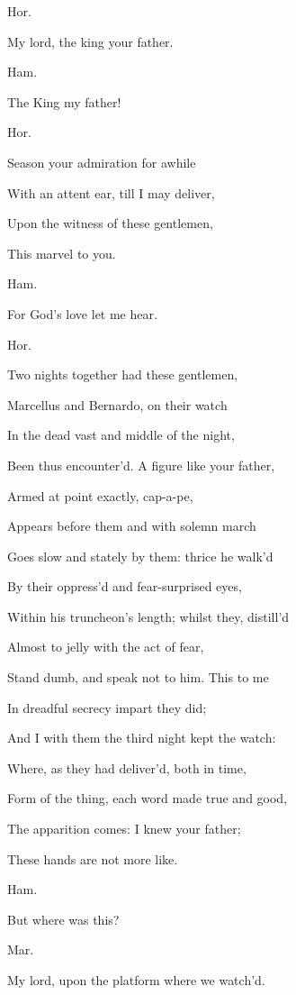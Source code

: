 \documentclass[12pt]{book}
\begin{document}
Hor.

My lord, the king your father.



Ham.

The King my father!



Hor.

Season your admiration for awhile

With an attent ear, till I may deliver,

Upon the witness of these gentlemen,

This marvel to you.



Ham.

For God's love let me hear.



Hor.

Two nights together had these gentlemen,

Marcellus and Bernardo, on their watch

In the dead vast and middle of the night,

Been thus encounter'd. A figure like your father,

Armed at point exactly, cap-a-pe,

Appears before them and with solemn march

Goes slow and stately by them: thrice he walk'd

By their oppress'd and fear-surprised eyes,

Within his truncheon's length; whilst they, distill'd

Almost to jelly with the act of fear,

Stand dumb, and speak not to him. This to me

In dreadful secrecy impart they did;

And I with them the third night kept the watch:

Where, as they had deliver'd, both in time,

Form of the thing, each word made true and good,

The apparition comes: I knew your father;

These hands are not more like.



Ham.

But where was this?



Mar.

My lord, upon the platform where we watch'd.
\end{document}
